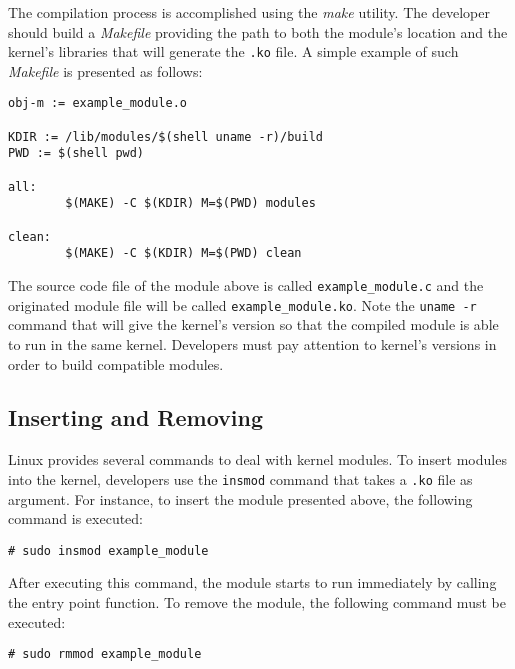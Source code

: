 The compilation process is accomplished using the \textit{make} utility. The developer should build a \textit{Makefile} providing the path to both the module's location and the kernel's libraries that will generate the \texttt{.ko} file. A simple example of such \textit{Makefile} is presented as follows:

\begin{lstlisting}[caption=Example of a Makefile to compile Loadable Kernel Modules]
obj-m := example_module.o

KDIR := /lib/modules/$(shell uname -r)/build
PWD := $(shell pwd)

all:
        $(MAKE) -C $(KDIR) M=$(PWD) modules

clean:
        $(MAKE) -C $(KDIR) M=$(PWD) clean
\end{lstlisting}

The source code file of the module above is called \texttt{example\_module.c} and the originated module file will be called \texttt{example\_module.ko}. Note the \texttt{uname -r} command that will give the kernel's version so that the compiled module is able to run in the same kernel. Developers must pay attention to kernel's versions in order to build compatible modules.

\subsection{Inserting and Removing}

Linux provides several commands to deal with kernel modules. To insert modules into the kernel, developers use the \texttt{insmod} command that takes a \texttt{.ko} file as argument. For instance, to insert the module presented above, the following command is executed:

\begin{lstlisting}[caption=Linux command to insert Loadable Kernel Modules]
# sudo insmod example_module
\end{lstlisting}

After executing this command, the module starts to run immediately by calling the entry point function. To remove the module, the following command must be executed:

\begin{lstlisting}[caption=Linux command to remove Loadable Kernel Modules]
# sudo rmmod example_module
\end{lstlisting}